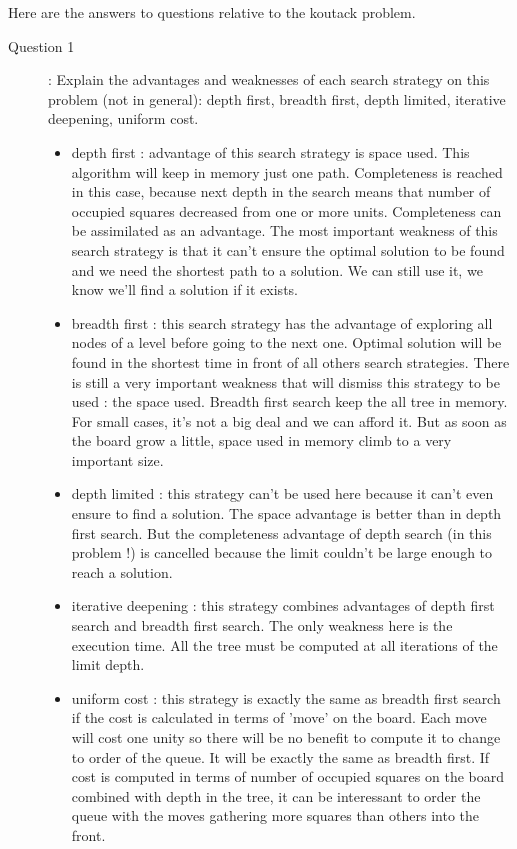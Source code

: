 Here are the answers to questions relative to the koutack problem. 
\begin{description}
\item [Question 1]: Explain the advantages and weaknesses of each search strategy on this problem (not in general): depth first, breadth first, depth limited, iterative deepening, uniform cost. \newline
\begin{itemize}
\item depth first : advantage of this search strategy is space used. This algorithm will keep in memory just one path. Completeness is reached in this case, because next depth in the search means that number of occupied squares decreased from one or more units. Completeness can be assimilated as an advantage. The most important weakness of this search strategy is that it can't ensure the optimal solution to be found and we need the shortest path to a solution. We can still use it, we know we'll find a solution if it exists.
\item breadth first : this search strategy has the advantage of exploring all nodes of a level before going to the next one. Optimal solution will be found in the shortest time in front of all others search strategies. There is still a very important weakness that will dismiss this strategy to be used : the space used. Breadth first search keep the all tree in memory. For small cases, it's not a big deal and we can afford it. But as soon as the board grow a little, space used in memory climb to a very important size.
\item depth limited : this strategy can't be used here because it can't even ensure to find a solution. The space advantage is better than in depth first search. But the completeness advantage of depth search (in this problem !) is cancelled because the limit couldn't be large enough to reach a solution.
\item iterative deepening : this strategy combines advantages of depth first search and breadth first search. The only weakness here is the execution time. All the tree must be computed at all iterations of the limit depth. 
\item uniform cost : this strategy is exactly the same as breadth first search if the cost is calculated in terms of 'move' on the board. Each move will cost one unity so there will be no benefit to compute it to change to order of the queue. It will be exactly the same as breadth first. If cost is computed in terms of number of occupied squares on the board combined with depth in the tree, it can be interessant to order the queue with the moves gathering more squares than others into the front.

\end{itemize}
\end{description}
